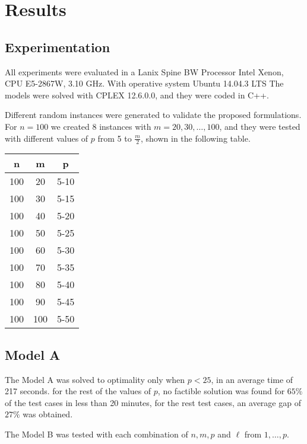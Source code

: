 
\section{Results}
\subsection{Experimentation}
\begin{frame}
  All experiments were evaluated in a Lanix Spine BW
  Processor Intel Xenon, CPU E5-2867W, 3.10 GHz.
  With operative system Ubuntu 14.04.3 LTS
  The models were solved with CPLEX 12.6.0.0,
  and they were coded in C++.
\end{frame}

\begin{frame}
  Different random instances were generated
  to validate the proposed formulations.
  For $n = 100$ we created 8 instances with $m = 20,30,\ldots,100$,
  and they were tested with different values of $p$ from 5 to $\frac{m}{2}$,
  shown in the following table.
  \begin{table}
    \centerign
    \begin{tabular}{|c|c|c|}\hline
      n & m & p \\ \hline
      100 & 20 & 5-10 \\
      100 & 30 & 5-15 \\
      100 & 40 & 5-20 \\
      100 & 50 & 5-25 \\
      100 & 60 & 5-30 \\
      100 & 70 & 5-35 \\
      100 & 80 & 5-40 \\
      100 & 90 & 5-45 \\
      100 & 100 & 5-50 \\
      \hline
    \end{tabular}
  \end{table}
\end{frame}

\subsection{Model A}
\begin{frame}
  The Model A was solved to optimality only when $p < 25$,
  in an average time of 217 seconds.
  for the rest of the values of $p$, 
  no factible solution was found for $65\%$ of the test cases in less than 20 minutes,
  for the rest test cases, an average gap of $27\%$ was obtained.

  The Model B was tested with each combination of $n,m,p$ and $\ell$ from $1,\ldots,p$.

\end{frame}

